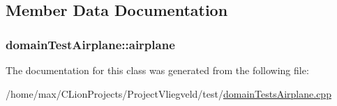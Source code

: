 \subsection{Member Data Documentation}
\subsubsection[{\texorpdfstring{airplane}{airplane}}]{ domain\+Test\+Airplane\+::airplane\hspace{0.3cm}{\ttfamily [protected]}}\hypertarget{classdomainTestAirplane_a5d07401cce1be605f6146628d7eb274b}{}\label{classdomainTestAirplane_a5d07401cce1be605f6146628d7eb274b}


The documentation for this class was generated from the following file\+:\begin{DoxyCompactItemize}
\item 
/home/max/\+C\+Lion\+Projects/\+Project\+Vliegveld/test/\hyperlink{domainTestsAirplane_8cpp}{domain\+Tests\+Airplane.\+cpp}\end{DoxyCompactItemize}
